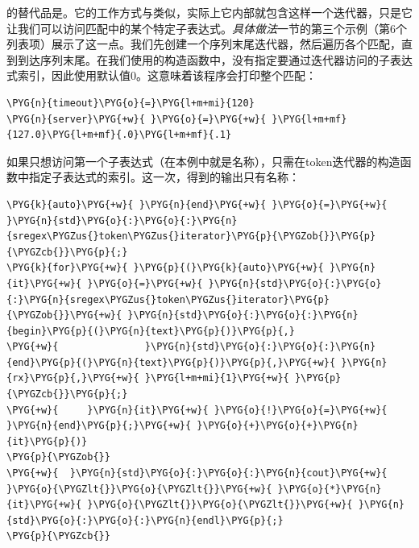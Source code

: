 
的替代品是。它的工作方式与类似，实际上它内部就包含这样一个迭代器，只是它让我们可以访问匹配中的某个特定子表达式。\textit{具体做法}一节的第三个示例（第6个列表项）展示了这一点。我们先创建一个序列末尾迭代器，然后遍历各个匹配，直到到达序列末尾。在我们使用的构造函数中，没有指定要通过迭代器访问的子表达式索引，因此使用默认值0。这意味着该程序会打印整个匹配：



\begin{codeblockbg}
\begin{Verbatim}[commandchars=\\\{\},breaklines=true,breakanywhere=true,fontsize=\codefont,xleftmargin=17bp]
\PYG{n}{timeout}\PYG{o}{=}\PYG{l+m+mi}{120}
\PYG{n}{server}\PYG{+w}{ }\PYG{o}{=}\PYG{+w}{ }\PYG{l+m+mf}{127.0}\PYG{l+m+mf}{.0}\PYG{l+m+mf}{.1}
\end{Verbatim}
\end{codeblockbg}



如果只想访问第一个子表达式（在本例中就是名称），只需在token迭代器的构造函数中指定子表达式的索引。这一次，得到的输出只有名称：



\begin{codeblockbg}
\begin{Verbatim}[commandchars=\\\{\},breaklines=true,breakanywhere=true,fontsize=\codefont,xleftmargin=17bp]
\PYG{k}{auto}\PYG{+w}{ }\PYG{n}{end}\PYG{+w}{ }\PYG{o}{=}\PYG{+w}{ }\PYG{n}{std}\PYG{o}{:}\PYG{o}{:}\PYG{n}{sregex\PYGZus{}token\PYGZus{}iterator}\PYG{p}{\PYGZob{}}\PYG{p}{\PYGZcb{}}\PYG{p}{;}
\PYG{k}{for}\PYG{+w}{ }\PYG{p}{(}\PYG{k}{auto}\PYG{+w}{ }\PYG{n}{it}\PYG{+w}{ }\PYG{o}{=}\PYG{+w}{ }\PYG{n}{std}\PYG{o}{:}\PYG{o}{:}\PYG{n}{sregex\PYGZus{}token\PYGZus{}iterator}\PYG{p}{\PYGZob{}}\PYG{+w}{ }\PYG{n}{std}\PYG{o}{:}\PYG{o}{:}\PYG{n}{begin}\PYG{p}{(}\PYG{n}{text}\PYG{p}{)}\PYG{p}{,}
\PYG{+w}{               }\PYG{n}{std}\PYG{o}{:}\PYG{o}{:}\PYG{n}{end}\PYG{p}{(}\PYG{n}{text}\PYG{p}{)}\PYG{p}{,}\PYG{+w}{ }\PYG{n}{rx}\PYG{p}{,}\PYG{+w}{ }\PYG{l+m+mi}{1}\PYG{+w}{ }\PYG{p}{\PYGZcb{}}\PYG{p}{;}
\PYG{+w}{     }\PYG{n}{it}\PYG{+w}{ }\PYG{o}{!}\PYG{o}{=}\PYG{+w}{ }\PYG{n}{end}\PYG{p}{;}\PYG{+w}{ }\PYG{o}{+}\PYG{o}{+}\PYG{n}{it}\PYG{p}{)}
\PYG{p}{\PYGZob{}}
\PYG{+w}{  }\PYG{n}{std}\PYG{o}{:}\PYG{o}{:}\PYG{n}{cout}\PYG{+w}{ }\PYG{o}{\PYGZlt{}}\PYG{o}{\PYGZlt{}}\PYG{+w}{ }\PYG{o}{*}\PYG{n}{it}\PYG{+w}{ }\PYG{o}{\PYGZlt{}}\PYG{o}{\PYGZlt{}}\PYG{+w}{ }\PYG{n}{std}\PYG{o}{:}\PYG{o}{:}\PYG{n}{endl}\PYG{p}{;}
\PYG{p}{\PYGZcb{}}
\end{Verbatim}
\end{codeblockbg}


